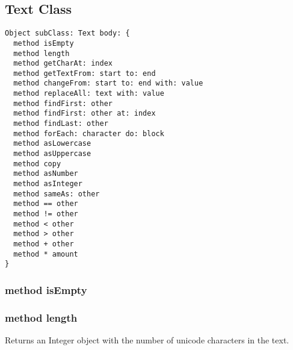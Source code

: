 \subsection {Text Class}

\begin{lstlisting}
Object subClass: Text body: {
  method isEmpty
  method length
  method getCharAt: index
  method getTextFrom: start to: end
  method changeFrom: start to: end with: value
  method replaceAll: text with: value
  method findFirst: other
  method findFirst: other at: index
  method findLast: other
  method forEach: character do: block
  method asLowercase
  method asUppercase
  method copy
  method asNumber
  method asInteger
  method sameAs: other
  method == other
  method != other
  method < other
  method > other
  method + other
  method * amount
}
\end{lstlisting}

\subsubsection{method isEmpty}

\subsubsection{method length}
Returns an Integer object with the number of unicode characters in the text.
